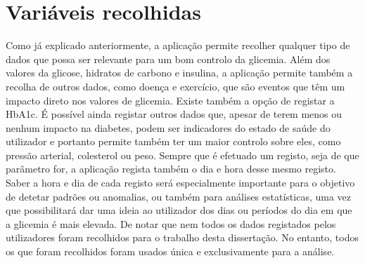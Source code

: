 \section{Variáveis recolhidas}

Como já explicado anteriormente, a aplicação permite recolher qualquer tipo de dados que possa ser relevante para um bom controlo da glicemia. Além dos valores da glicose, hidratos de carbono e insulina, a aplicação permite também a recolha de outros dados, como doença e exercício, que são eventos que têm um impacto direto nos valores de glicemia. Existe também a opção de registar a \ac{HbA1c}. É possível ainda registar outros dados que, apesar de terem menos ou nenhum impacto na diabetes, podem ser indicadores do estado de saúde do utilizador e portanto permite também ter um maior controlo sobre eles, como pressão arterial, colesterol ou peso.
Sempre que é efetuado um registo, seja de que parâmetro for, a aplicação regista também o dia e hora desse mesmo registo. Saber a hora e dia de cada registo será especialmente importante para o objetivo de detetar padrões ou anomalias, ou também para análises estatísticas, uma vez que possibilitará dar uma ideia ao utilizador dos dias ou períodos do dia em que a glicemia é mais elevada. De notar que nem todos os dados registados pelos utilizadores foram recolhidos para o trabalho desta dissertação. No entanto, todos os que foram recolhidos foram usados única e exclusivamente para a análise. 

